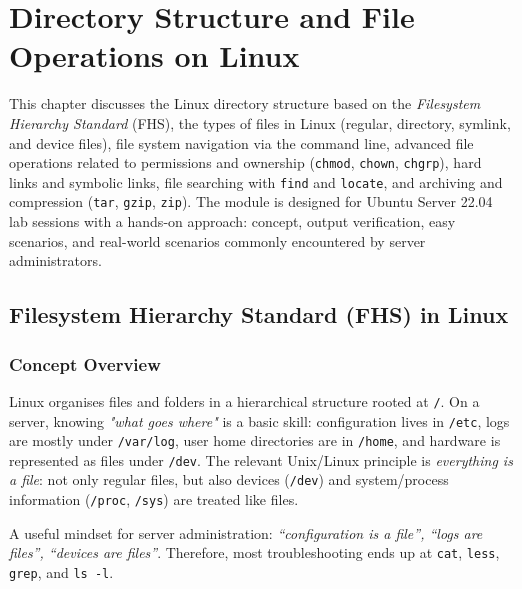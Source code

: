 
\chapter{Directory Structure and File Operations on Linux}
\label{ch:filesystem-ops}

This chapter discusses the Linux directory structure based on the
\textit{Filesystem Hierarchy Standard} (FHS), the types of files in Linux
(regular, directory, symlink, and device files), file system navigation via the
command line, advanced file operations related to permissions and ownership
(\texttt{chmod}, \texttt{chown}, \texttt{chgrp}), hard links and symbolic
links, file searching with \texttt{find} and \texttt{locate}, and archiving
and compression (\texttt{tar}, \texttt{gzip}, \texttt{zip}). The module is
designed for Ubuntu Server 22.04 lab sessions with a hands-on approach:
concept, output verification, easy scenarios, and real-world scenarios
commonly encountered by server administrators.

\section{Filesystem Hierarchy Standard (FHS) in Linux}
\label{sec:fhs}

\subsection*{Concept Overview}
Linux organises files and folders in a hierarchical structure rooted at
\texttt{/}. On a server, knowing \textit{"what goes where"} is a basic skill:
configuration lives in \texttt{/etc}, logs are mostly under \texttt{/var/log},
user home directories are in \texttt{/home}, and hardware is represented as
files under \texttt{/dev}. The relevant Unix/Linux principle is
\textit{everything is a file}: not only regular files, but also devices
(\texttt{/dev}) and system/process information (\texttt{/proc}, \texttt{/sys})
are treated like files.

\begin{tipbox}
A useful mindset for server administration:
\textit{``configuration is a file'', ``logs are files'', ``devices are files''}.
Therefore, most troubleshooting ends up at \texttt{cat}, \texttt{less},
\texttt{grep}, and \texttt{ls -l}.
\end{tipbox}

